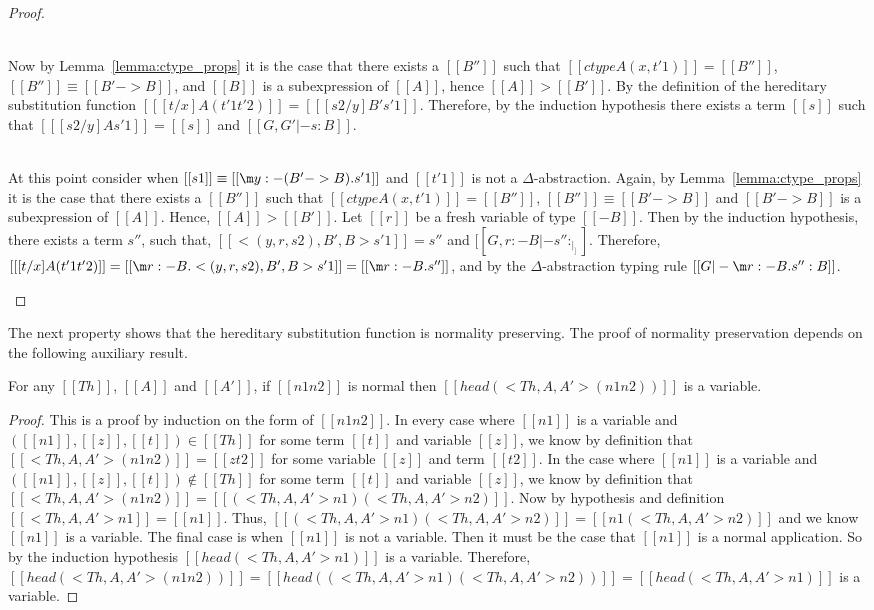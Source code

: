 \begin{proof}
\begin{itemize}
    \ \\
    Now by Lemma~\ref{lemma:ctype_props} it is the case that 
    there exists a $[[B'']]$ such that $[[ctype A (x,t'1)]] = [[B'']]$, 
    $[[B'']] \equiv [[B' -> B]]$, and $[[B]]$ is a subexpression of $[[A]]$, hence
    $[[A]] > [[B']]$.  By the definition of the hereditary substitution function
    $[[ [t/x] A (t'1 t'2)]] = [[ [s2/y] B' s'1]]$. Therefore, by the induction hypothesis there exists a 
    term $[[s]]$ such that $[[ [s2/y] A s'1]] = [[s]]$ and $[[G,G' |- s:B]]$.

    \ \\
    At this point consider when $[[s1]] \equiv [[\m y:{-(B'->B)}.s'1]]$ and $[[t'1]]$ is not a 
    $\Delta$-abstraction.  Again, by Lemma~\ref{lemma:ctype_props} it is the case that 
    there exists a $[[B'']]$ such that $[[ctype A (x,t'1)]] = [[B'']]$, $[[B'']] \equiv [[B' -> B]]$ and
    $[[B' -> B]]$ is a subexpression of $[[A]]$.  Hence, $[[A]] > [[B']]$. Let $[[r]]$ be a fresh variable of type $[[{-B}]]$.    
    Then by the induction hypothesis, there exists a term $s''$, such that, $[[<(y,r,s2),B',B>s'1]] = s''$ and 
    $[[G,r:{-B} |- s'' : _|_]]$.  Therefore, $[[ [t/x] A (t'1 t'2)]] = [[\m r:{-B}.<(y,r,s2),B',B>s'1]] = [[\m r:{-B}.s'']]$,
    and by the $\Delta$-abstraction typing rule $[[G |- \m r:{-B}.s'' : B]]$.
  \end{itemize}
\end{proof}
The next property shows that the hereditary substitution function is
normality preserving. The proof of normality preservation depends on
the following auxiliary result.
\begin{lemma}
  \label{lemma:ssub_var_head}
  For any $[[Th]]$, $[[A]]$ and $[[A']]$, if $[[n1 n2]]$ is normal then 
  $[[head (<Th,A,A'>(n1 n2))]]$ is a variable.
\end{lemma}
\begin{proof}
  This is a proof by induction on the form of $[[n1 n2]]$.
In every case where $[[n1]]$ is a variable and $([[n1]],[[z]],[[t]]) \in [[Th]]$ for some 
term $[[t]]$ and variable $[[z]]$, we know by definition
that $[[<Th,A,A'>(n1 n2)]] = [[z t2]]$ for some variable $[[z]]$ 
and term $[[t2]]$.  In the case where $[[n1]]$ is a variable and 
$([[n1]],[[z]],[[t]]) \not\in [[Th]]$ for some 
term $[[t]]$ and variable $[[z]]$, we know by definition
that $[[<Th,A,A'>(n1 n2)]] = [[(<Th,A,A'>n1) (<Th,A,A'>n2)]]$.  Now
by hypothesis and definition $[[<Th,A,A'>n1]] = [[n1]]$.  Thus,
$[[(<Th,A,A'>n1) (<Th,A,A'>n2)]] = [[n1 (<Th,A,A'>n2)]]$ and we know $[[n1]]$ is
a variable.  The final case is when $[[n1]]$ is not a variable.  Then it must
be the case that $[[n1]]$ is a normal application.  So by the induction hypothesis
$[[head (<Th,A,A'>n1)]]$ is a variable.  Therefore,
$[[head (<Th,A,A'>(n1 n2))]] = [[head ((<Th,A,A'> n1) (<Th,A,A'> n2))]] = [[head (<Th,A,A'> n1)]]$ is a variable.
\end{proof}
